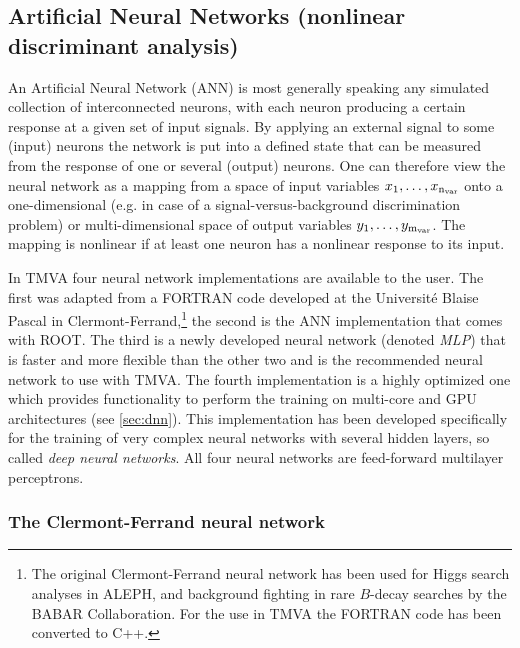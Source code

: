 \subsection{Artificial Neural Networks
 (nonlinear discriminant analysis)}
\label{sec:ann}

An Artificial Neural Network  (ANN)
is most generally speaking any simulated collection of interconnected
neurons, with each neuron producing a certain response at a given set
of input signals. By applying an external signal to some (input)
neurons the network is put into a defined state that can be measured
from the response of one or several (output) neurons. One can therefore
view the neural network as a mapping from a space of input variables
$x_1,\dots, x_{\rm n_{var}}$ onto a one-dimensional (e.g. in case of a
signal-versus-background discrimination problem) or multi-dimensional
space of output variables $y_1,\dots, y_{\rm m_{var}}$. The mapping is
nonlinear if at least one neuron has a nonlinear response to its input.

In TMVA four neural network implementations are available to the user. The
first was adapted from a FORTRAN code developed at the Universit\'e Blaise
Pascal in Clermont-Ferrand,\footnote
{
   The original Clermont-Ferrand neural network has been used for Higgs
   search analyses in ALEPH, and background fighting in rare $B$-decay
   searches by the BABAR Collaboration. For the use in TMVA the FORTRAN
   code has been converted to C++.
}
the second is the ANN implementation that comes with ROOT. The third
is a newly developed neural network (denoted {\em MLP}) that is faster
and more flexible than the other two and is the recommended neural
network to use with TMVA. The fourth implementation is a highly
optimized one which provides functionality to perform the training on
multi-core and GPU architectures (see \ref{sec:dnn}). This
implementation has been developed specifically for the training of
very complex neural networks with several hidden layers, so called
\textit{deep neural networks}. All four neural networks are
feed-forward multilayer perceptrons.  

\subsubsection*{The Clermont-Ferrand neural network}

